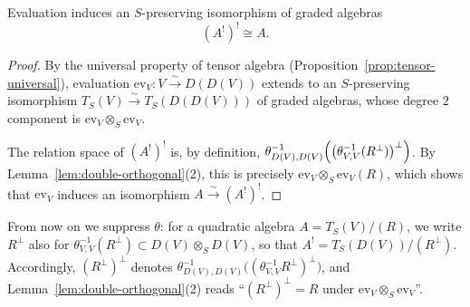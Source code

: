 
\begin{theorem}\label{thm:quadratic-involution}
Evaluation induces an $S$-preserving isomorphism of graded algebras
\[
(A^!)^!\cong A.
\]
\end{theorem}

\begin{proof}
By the universal property of tensor algebra (Proposition~\ref{prop:tensor-universal}), evaluation $\mathrm{ev}_V:V\xrightarrow{\sim}D(D(V))$ extends to an $S$-preserving isomorphism $T_S(V)\xrightarrow{\sim}T_S(D(D(V)))$ of graded algebras, whose degree $2$ component is $\mathrm{ev}_V\otimes_S\mathrm{ev}_V$.

The relation space of $(A^!)^!$ is, by definition, $\theta_{D(V),D(V)}^{-1}\Bigl(\bigl(\theta_{V,V}^{-1}(R^\perp)\bigr)^\perp\Bigr)$. 
By Lemma~\ref{lem:double-orthogonal}(2), this is precisely $\mathrm{ev}_V\otimes_S\mathrm{ev}_V(R)$, which shows that $\mathrm{ev}_V$ induces an isomorphism $A\xrightarrow{\sim}(A^!)^!$.
\end{proof}

\begin{convention}
From now on we suppress $\theta$: for a quadratic algebra $A=T_S(V)/(R)$, we write $R^\perp$ also for $\theta_{V,V}^{-1}(R^\perp)\subset D(V)\otimes_SD(V)$, so that $A^!=T_S(D(V))/(R^\perp)$.
Accordingly, $(R^\perp)^\perp$ denotes $\theta_{D(V),D(V)}^{-1}\bigl((\theta_{V,V}^{-1}R^\perp)^\perp\bigr)$, and Lemma~\ref{lem:double-orthogonal}(2) reads ``$(R^\perp)^\perp=R$ under $\mathrm{ev}_V\otimes_S\mathrm{ev}_V$''.
\end{convention}

